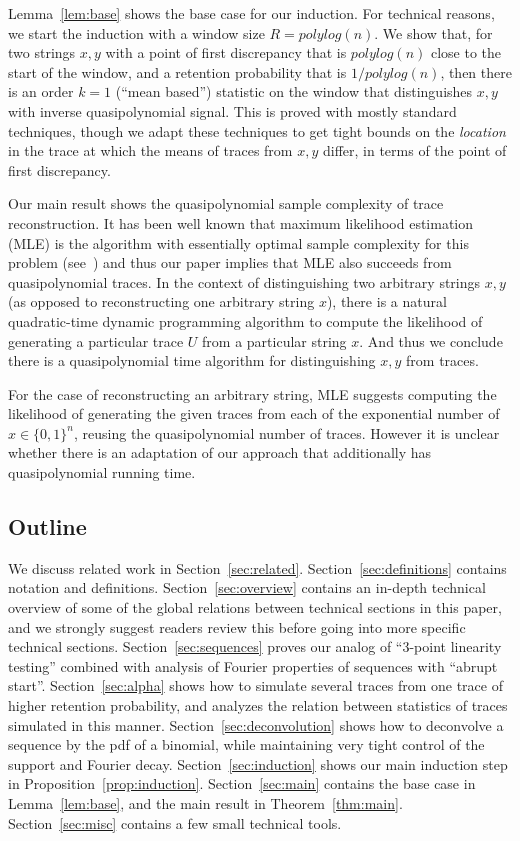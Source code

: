 \documentclass[11pt]{article}
\theoremstyle{plain}
\begin{document}
Lemma~\ref{lem:base} shows the base case for our induction. For technical reasons, we start the induction with a window size $R=polylog(n)$. We show that, for two strings $x,y$ with a point of first discrepancy that is $polylog(n)$ close to the start of the window, and a retention probability that is $1/polylog(n)$, then there is an order $k=1$ (``mean based'') statistic on the window that distinguishes $x,y$ with inverse quasipolynomial signal. This is proved with mostly standard techniques, though we adapt these techniques to get tight bounds on the \emph{location} in the trace at which the means of traces from $x,y$ differ, in terms of the point of first discrepancy.

\medskip{}

Our main result shows the quasipolynomial sample complexity of trace reconstruction. It has been well known that maximum likelihood estimation (MLE) is the algorithm with essentially optimal sample complexity for this problem (see~\cite{kuan24on}) and thus our paper implies that MLE also succeeds from quasipolynomial traces. In the context of distinguishing two arbitrary strings $x,y$ (as opposed to reconstructing one arbitrary string $x$), there is a natural quadratic-time dynamic programming algorithm to compute the likelihood of generating a particular trace $U$ from a particular string $x$. And thus we conclude there is a quasipolynomial time algorithm for distinguishing $x,y$ from traces.

For the case of reconstructing an arbitrary string, MLE suggests computing the likelihood of generating the given traces from each of the exponential number of $x\in\{0,1\}^n$, reusing the quasipolynomial number of traces. However it is unclear whether there is an adaptation of our approach that additionally has quasipolynomial running time.

\subsection{Outline}
We discuss related work in Section~\ref{sec:related}. Section~\ref{sec:definitions} contains notation and definitions. Section~\ref{sec:overview} contains an in-depth technical overview of some of the global relations between technical sections in this paper, and we strongly suggest readers review this before going into more specific technical sections. Section~\ref{sec:sequences} proves our analog of ``3-point linearity testing'' combined with analysis of Fourier properties of sequences with ``abrupt start''. Section~\ref{sec:alpha} shows how to simulate several traces from one trace of higher retention probability, and analyzes the relation between statistics of traces simulated in this manner. Section~\ref{sec:deconvolution} shows how to deconvolve a sequence by the pdf of a binomial, while maintaining very tight control of the support and Fourier decay. Section~\ref{sec:induction} shows our main induction step in Proposition~\ref{prop:induction}. Section~\ref{sec:main} contains the base case in Lemma~\ref{lem:base}, and the main result in Theorem~\ref{thm:main}. Section~\ref{sec:misc} contains a few small technical tools.
\end{document}
